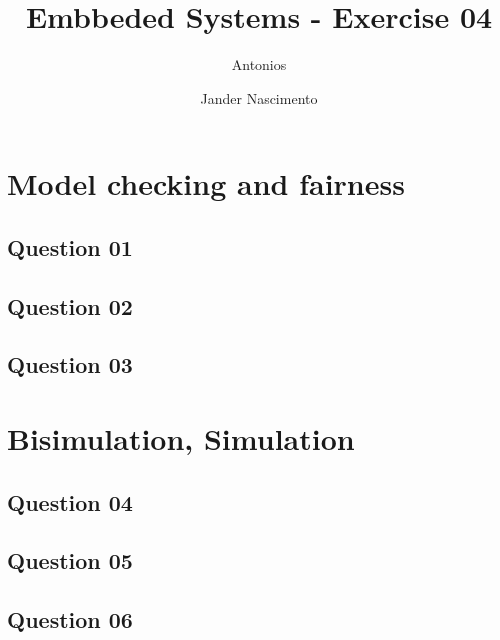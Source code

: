 \documentclass[a4paper]{article}
\begin{document}
\title{Embbeded Systems - Exercise 04}

\author{Antonios \and Jander Nascimento}

\maketitle

\section*{Model checking and fairness}

\subsection*{Question 01}

\subsection*{Question 02}

\subsection*{Question 03}

\section*{Bisimulation, Simulation}

\subsection*{Question 04}

\subsection*{Question 05}

\subsection*{Question 06}
\end{document}

